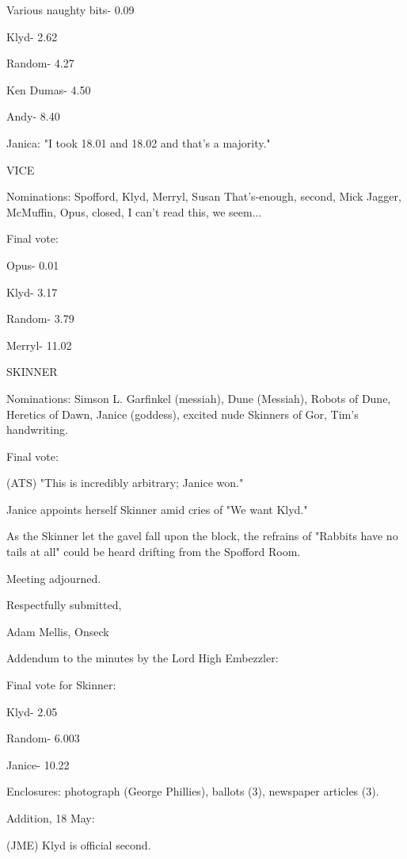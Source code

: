 \documentclass[12pt]{article}
\begin{document}
Various naughty bits- 0.09

Klyd- 2.62

Random- 4.27

Ken Dumas- 4.50

Andy- 8.40

Janica: "I took 18.01 and 18.02 and that's a majority."

VICE

Nominations: Spofford, Klyd, Merryl, Susan That's-enough, second, Mick Jagger, McMuffin, Opus, closed, I can't read this, we seem...

Final vote:

Opus- 0.01

Klyd- 3.17

Random- 3.79

Merryl- 11.02

SKINNER

Nominations: Simson L. Garfinkel (messiah), Dune (Messiah), Robots of Dune, Heretics of Dawn, Janice (goddess), excited nude Skinners of Gor, Tim's handwriting.

Final vote:

(ATS) "This is incredibly arbitrary; Janice won."

Janice appoints herself Skinner amid cries of "We want Klyd."

As the Skinner let the gavel fall upon the block, the refrains of "Rabbits have no tails at all" could be heard drifting from the Spofford Room.

\vspace{12pt}

\noindent
Meeting adjourned.

\vspace{18pt}

\centerline{Respectfully submitted,}
\centerline{Adam Mellis, Onseck}

Addendum to the minutes by the Lord High Embezzler:

Final vote for Skinner:

Klyd- 2.05

Random- 6.003

Janice- 10.22

Enclosures: photograph (George Phillies), ballots (3), newspaper articles (3).

Addition, 18 May:

(JME) Klyd is official second.
\end{document}
